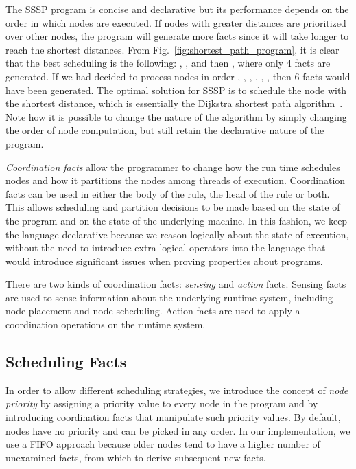 The SSSP program is concise and declarative but its performance depends on the order in which nodes are
executed. If nodes with greater distances are prioritized over other nodes, the
program will generate more  facts since it will take longer to
reach the shortest distances. From Fig.~\ref{fig:shortest_path_program}, it is
clear that the best scheduling is the following: ,
,  and then , where only 4 
facts are generated. If we had decided to process nodes in order
, , , , ,
, then 6  facts would have been generated.
The optimal solution for SSSP is to schedule the node with the
shortest distance, which is essentially the Dijkstra shortest path
algorithm~\cite{Dijkstra}. Note how it is possible to change the nature of
the algorithm by simply changing the order of node computation, but still
retain the declarative nature of the program.

\emph{Coordination facts} allow the programmer
to change how the run time schedules nodes and how it partitions the nodes among
threads of execution. Coordination facts can be used in either the body of the
rule, the head of the rule or both.
This allows scheduling and partition decisions to be made based on the state of
the program and on the state of the underlying machine.
In this fashion, we keep the language declarative because we reason logically
about the state of execution, without the need to introduce extra-logical
operators into the language that would introduce significant issues when proving
properties about programs.

There are two kinds of coordination facts: \emph{sensing} and \emph{action}
facts. Sensing facts are used to sense information about the
underlying runtime system, including node placement and node scheduling.
Action facts are used to apply a coordination operations on the runtime system.

\subsection{Scheduling Facts}\label{sec:fifo}

In order to allow different scheduling strategies, we introduce the concept of
\emph{node priority} by assigning a priority value to every node in the program
and by introducing coordination facts that manipulate such priority values.
By default, nodes have no priority and can be picked in any order. In
our implementation, we use a FIFO approach because
older nodes tend to have a higher number of unexamined facts, from which to derive
subsequent new facts.

